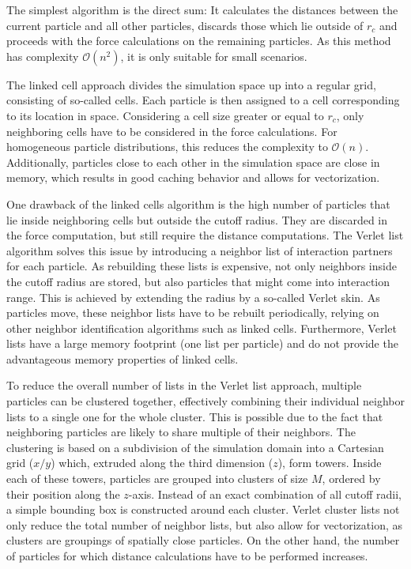 \begin{description}[leftmargin=!,labelwidth=\widthof{\textbf{Verlet Cluster Lists}}]
	\item[\textbf{Direct Sum}] The simplest algorithm is the direct sum: It calculates the distances between the current particle and all other particles, discards those which lie outside of $r_c$ and proceeds with the force calculations on the remaining particles. As this method has complexity $\mathcal{O}\left(n^2\right)$, it is only suitable for small scenarios.
	\item[\textbf{Linked Cells}] The linked cell approach divides the simulation space up into a regular grid, consisting of so-called cells. Each particle is then assigned to a cell corresponding to its location in space. Considering a cell size greater or equal to $r_c$, only neighboring cells have to be considered in the force calculations. For homogeneous particle distributions, this reduces the complexity to $\mathcal{O}\left(n\right)$. Additionally, particles close to each other in the simulation space are close in memory, which results in good caching behavior and allows for vectorization.
	\item[\textbf{Verlet Lists}] One drawback of the linked cells algorithm is the high number of particles that lie inside neighboring cells but outside the cutoff radius. They are discarded in the force computation, but still require the distance computations. The Verlet list algorithm solves this issue by introducing a neighbor list of interaction partners for each particle. As rebuilding these lists is expensive, not only neighbors inside the cutoff radius are stored, but also particles that might come into interaction range. This is achieved by extending the radius by a so-called Verlet skin. As particles move, these neighbor lists have to be rebuilt periodically, relying on other neighbor identification algorithms such as linked cells. Furthermore, Verlet lists have a large memory footprint (one list per particle) and do not provide the advantageous memory properties of linked cells.
	\item[\textbf{Verlet Cluster Lists}] To reduce the overall number of lists in the Verlet list approach, multiple particles can be clustered together, effectively combining their individual neighbor lists to a single one for the whole cluster. This is possible due to the fact that neighboring particles are likely to share multiple of their neighbors. The clustering is based on a subdivision of the simulation domain into a Cartesian grid ($x/y$) which, extruded along the third dimension ($z$), form towers. Inside each of these towers, particles are grouped into clusters of size $M$, ordered by their position along the $z$-axis. Instead of an exact combination of all cutoff radii, a simple bounding box is constructed around each cluster. Verlet cluster lists not only reduce the total number of neighbor lists, but also allow for vectorization, as clusters are groupings of spatially close particles. On the other hand, the number of particles for which distance calculations have to be performed increases.
\end{description}
